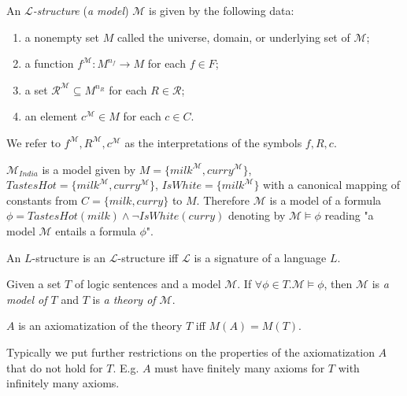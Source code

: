 \begin{defn}
An \emph{$\mathcal{L}$-structure} (\emph{a model}) $\mathcal{M}$ is given by the following data:
\begin{enumerate}
\item a nonempty set $M$ called the universe, domain, or underlying set of $\mathcal{M}$;
\item a function $f^{\mathcal{M}} : M^{n_f} \to M$ for each $f \in F$;
\item a set $\mathcal{R}^{\mathcal{M}} \subseteq M^{n_R}$ for each $R \in \mathcal{R}$;
\item an element $c^\mathcal{M} \in M$ for each $c \in C$.
\end{enumerate}
We refer to $f^\mathcal{M}, R^\mathcal{M}, c^\mathcal{M}$ as the interpretations of the symbols $f ,R, c$.
\end{defn}

\begin{exmp}
$\mathcal{M}_{India}$ is a model given by
$M=\{milk^\mathcal{M}, curry^\mathcal{M}\}$,
$TastesHot=\{milk^\mathcal{M}, curry^\mathcal{M}\}$,
$IsWhite=\{milk^\mathcal{M}\}$ with a canonical mapping of constants from
 $C=\{milk, curry\}$ to $M$. Therefore $\mathcal{M}$ is a model of a formula
$\phi=TastesHot(milk) \wedge \neg IsWhite(curry)$ denoting by
$\mathcal{M} \models \phi$ reading "a model $\mathcal{M}$ entails a formula $\phi$".
\end{exmp}

\begin{remark}
An $L$-structure is an $\mathcal{L}$-structure iff $\mathcal{L}$ is a signature of a language $L$.
\end{remark}

\begin{defn}
Given a set $T$ of logic sentences and a model $\mathcal{M}$. If $\forall \phi \in T. \mathcal{M} \models \phi$, then $\mathcal{M}$ is \emph{a model of $T$} and $T$ is \emph{a theory of $\mathcal{M}$}.
\end{defn}

\begin{defn}
$A$ is an axiomatization of the theory $T$ iff $M(A)=M(T)$.
\end{defn}

\begin{remark}
Typically we put further restrictions on the properties of the axiomatization $A$ that do not hold for $T$. E.g. $A$ must have finitely many axioms for $T$ with infinitely many axioms.
\end{remark}

